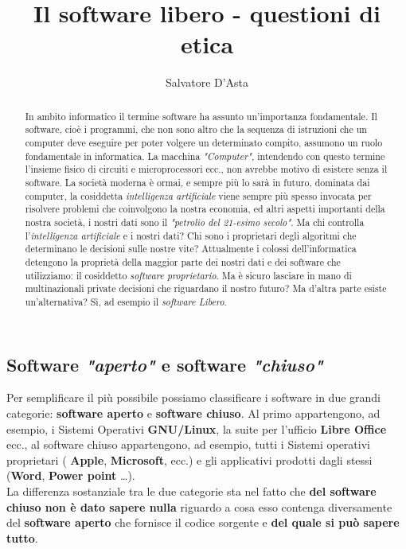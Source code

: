 \documentclass[]{article}
\title{Il software libero - questioni di etica }
\author{Salvatore D'Asta}
\begin{document}
\maketitle

\begin{abstract}
In ambito informatico il termine software ha assunto un'importanza fondamentale. Il software, cioè i programmi, che non sono altro che  la sequenza di istruzioni che  un computer deve eseguire per poter volgere un determinato compito, assumono un ruolo fondamentale in informatica. La macchina \textit{"Computer"}, intendendo con questo termine l'insieme fisico di circuiti e microprocessori ecc., non avrebbe motivo di esistere senza il software. La società moderna è ormai, e sempre più lo sarà in futuro, dominata dai computer, la cosiddetta \textit{intelligenza artificiale} viene sempre più spesso invocata per risolvere problemi che coinvolgono la nostra economia, ed altri aspetti importanti della nostra società, i nostri dati sono il \textit{"petrolio del 21-esimo secolo"}. Ma chi controlla l'\textit{intelligenza artificiale} e i nostri dati? Chi sono i proprietari degli algoritmi che determinano le decisioni sulle nostre vite? Attualmente i colossi dell'informatica detengono la proprietà della maggior parte dei nostri dati e dei software che utilizziamo: il cosiddetto \textit{software proprietario}. Ma è sicuro lasciare in mano di multinazionali private decisioni che riguardano il nostro futuro? Ma d'altra parte esiste un'alternativa? Sì, ad esempio il \textit{software Libero}.       
\end{abstract}


\subsection{Software\textit{ "aperto"} e software \textit{"chiuso"}}
Per semplificare il più possibile possiamo classificare i software in due grandi categorie: \textbf{software aperto} e \textbf{software chiuso}. Al primo appartengono, ad esempio, i Sistemi Operativi \textbf{GNU/Linux}, la suite per l’ufficio \textbf{Libre Office} ecc.,  al software chiuso appartengono, ad esempio, tutti i Sistemi operativi proprietari ( \textbf{Apple}, \textbf{Microsoft}, ecc.) e gli applicativi prodotti dagli stessi (\textbf{Word}, \textbf{Power point} …). \\  

La differenza sostanziale tra le due categorie sta nel fatto che \textbf{del software chiuso non è dato sapere nulla} riguardo a cosa esso contenga diversamente del \textbf{software aperto} che fornisce il codice sorgente e \textbf{del quale si può sapere tutto}. \\
\end{document}
